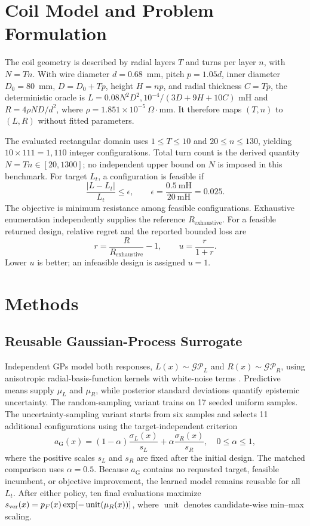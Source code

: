 \documentclass[conference]{IEEEtran}
\begin{document}
\section{Coil Model and Problem Formulation}
The coil geometry is described by radial layers $T$ and turns per layer $n$, with $N=Tn$. With wire diameter $d=0.68$~mm, pitch $p=1.05d$, inner diameter $D_0=80$~mm, $D=D_0+Tp$, height $H=np$, and radial thickness $C=Tp$, the deterministic oracle is $L=0.08N^2D^2,10^{-4}/(3D+9H+10C)$ mH and $R=4\rho ND/d^2$, where $\rho=1.851\times10^{-5}~\Omega\cdot\mathrm{mm}$. It therefore maps $(T,n)$ to $(L,R)$ without fitted parameters.

The evaluated rectangular domain uses $1\leq T\leq10$ and $20\leq n\leq130$, yielding $10\times111=1{,}110$ integer configurations. Total turn count is the derived quantity $N=Tn\in[20,1300]$; no independent upper bound on $N$ is imposed in this benchmark. For target $L_t$, a configuration is feasible if
\begin{equation}
 \frac{|L-L_t|}{L_t}\leq\epsilon,\qquad
 \epsilon=\frac{0.5\ \mathrm{mH}}{20\ \mathrm{mH}}=0.025.
\end{equation}
The objective is minimum resistance among feasible configurations. Exhaustive enumeration independently supplies the reference $R_{\mathrm{exhaustive}}$. For a feasible returned design, relative regret and the reported bounded loss are
\begin{equation}
 r=\frac{R}{R_{\mathrm{exhaustive}}}-1,\qquad u=\frac{r}{1+r}.
\end{equation}
Lower $u$ is better; an infeasible design is assigned $u=1$.

\section{Methods}
\subsection{Reusable Gaussian-Process Surrogate}
Independent GPs model both responses, $L(x)\sim\mathcal{GP}_L$ and $R(x)\sim\mathcal{GP}_R$, using anisotropic radial-basis-function kernels with white-noise terms \cite{rasmussen}. Predictive means supply $\mu_L$ and $\mu_R$, while posterior standard deviations quantify epistemic uncertainty. The random-sampling variant trains on 17 seeded uniform samples. The uncertainty-sampling variant starts from six samples and selects 11 additional configurations using the target-independent criterion
\begin{equation}
a_{\mathrm{G}}(x)=(1-\alpha)\frac{\sigma_L(x)}{s_L}
 +\alpha\frac{\sigma_R(x)}{s_R},\quad 0\leq\alpha\leq1,
\end{equation}
where the positive scales $s_L$ and $s_R$ are fixed after the initial design. The matched comparison uses $\alpha=0.5$. Because $a_{\mathrm{G}}$ contains no requested target, feasible incumbent, or objective improvement, the learned model remains reusable for all $L_t$. After either policy, ten final evaluations maximize $s_{\rm ver}(x)=p_F(x)\exp[-\operatorname{unit}(\mu_R(x))]$, where $\operatorname{unit}$ denotes candidate-wise min--max scaling.
\end{document}
